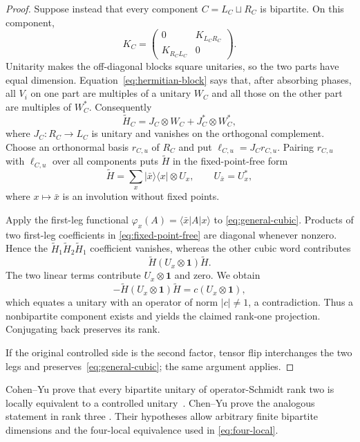 \documentclass[11pt]{article}
\theoremstyle{definition}
\theoremstyle{remark}
\newcommand{\Id}{\mathbf 1}
\begin{document}
\begin{proof}
Suppose instead that every component \(C=L_C\sqcup R_C\) is bipartite.
On this component,
\[
 K_C=
 \begin{pmatrix}0&K_{L_CR_C}\\K_{R_CL_C}&0\end{pmatrix}.
\]
Unitarity makes the off-diagonal blocks square unitaries, so the two parts
have equal dimension. Equation~\eqref{eq:hermitian-block} says that,
after absorbing phases, all \(V_i\) on one part are multiples of a
unitary \(W_C\) and all those on the other part are multiples of
\(W_C^*\). Consequently
\[
 \widetilde H_C
 =J_C\otimes W_C+J_C^*\otimes W_C^*,
\]
where \(J_C:R_C\to L_C\) is unitary and vanishes on the orthogonal
complement. Choose an orthonormal basis \(r_{C,u}\) of \(R_C\) and put
\(\ell_{C,u}=J_Cr_{C,u}\). Pairing \(r_{C,u}\) with
\(\ell_{C,u}\) over all components puts \(\widetilde H\) in the
fixed-point-free form
\begin{equation}
  \widetilde H
  =\sum_x|\bar x\rangle\langle x|\otimes U_x,
  \qquad U_{\bar x}=U_x^*,
  \label{eq:fixed-point-free}
\end{equation}
where \(x\mapsto\bar x\) is an involution without fixed points.

Apply the first-leg functional
\(\varphi_x(A)=\langle\bar x|A|x\rangle\) to
\eqref{eq:general-cubic}. Products of two first-leg coefficients in
\eqref{eq:fixed-point-free} are diagonal whenever nonzero. Hence the
\(\widetilde H_1\widetilde H_2\widetilde H_1\) coefficient vanishes,
whereas the other cubic word contributes
\[
  \widetilde H(U_x\otimes\Id)\widetilde H.
\]
The two linear terms contribute \(U_x\otimes\Id\) and zero. We obtain
\[
  -\widetilde H(U_x\otimes\Id)\widetilde H
  =c(U_x\otimes\Id),
\]
which equates a unitary with an operator of norm \(|c|\ne1\), a
contradiction. Thus a nonbipartite component exists and yields the claimed
rank-one projection. Conjugating back preserves its rank.

If the original controlled side is the second factor, tensor flip
interchanges the two legs and preserves~\eqref{eq:general-cubic}; the same
argument applies.
\end{proof}

Cohen--Yu prove that every bipartite unitary of operator-Schmidt rank two
is locally equivalent to a controlled unitary~\cite[Theorem 6]{CohenYu}.
Chen--Yu prove the analogous statement in rank three
\cite[Theorem 11]{ChenYu}. Their hypotheses allow arbitrary finite
bipartite dimensions and the four-local equivalence used in
\eqref{eq:four-local}.
\end{document}
